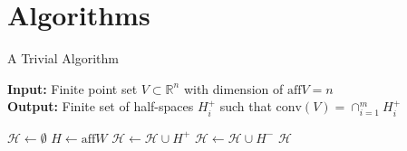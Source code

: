 \documentclass[9pt]{beamer}
\newcommand\R{\mathbb{R}}
\theoremstyle{definition}
\begin{document}


\section{Algorithms}

\begin{frame}[fragile]{A Trivial Algorithm}
  
  \begin{algorithm}[H]
    \textbf{Input:} Finite point set $V \subset \R^n$ with dimension of $\text{aff}V = n$\\
    \textbf{Output:} Finite set of half-spaces $H_i^+$ such that $\text{conv}(V) =
    \cap_{i=1}^m H_i^+$
    \begin{algorithmic}[1]
      \STATE $\mathcal{H} \leftarrow \emptyset$
      \STATE $H \leftarrow \text{aff} W$
      \STATE $\mathcal{H} \leftarrow \mathcal{H} \cup H^+$
      \ELSE $\mathcal{H} \leftarrow \mathcal{H} \cup H^-$
      \ENDIF
      \ENDFOR
      \RETURN $\mathcal{H}$
    \end{algorithmic}
  \end{algorithm}
\end{frame}
\end{document}
